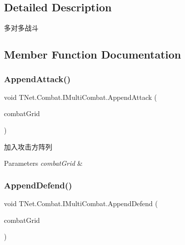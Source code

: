 \subsection{Detailed Description}
多对多战斗 



\subsection{Member Function Documentation}
\mbox{\label{interface_t_net_1_1_combat_1_1_i_multi_combat_a6830542d0db6ef7e89ff9717e3db5781}} 
\subsubsection{\texorpdfstring{Append\+Attack()}{AppendAttack()}}
{\footnotesize\ttfamily void T\+Net.\+Combat.\+I\+Multi\+Combat.\+Append\+Attack (\begin{DoxyParamCaption}\item[{\mbox{\hyperlink{class_t_net_1_1_model_1_1_embattle_queue}{Embattle\+Queue}}}]{combat\+Grid }\end{DoxyParamCaption})}



加入攻击方阵列 


\begin{DoxyParams}{Parameters}
{\em combat\+Grid} & \\
\hline
\end{DoxyParams}
\mbox{\label{interface_t_net_1_1_combat_1_1_i_multi_combat_a8d68c61f5dcba443db9ea60fe411e185}} 
\subsubsection{\texorpdfstring{Append\+Defend()}{AppendDefend()}}
{\footnotesize\ttfamily void T\+Net.\+Combat.\+I\+Multi\+Combat.\+Append\+Defend (\begin{DoxyParamCaption}\item[{\mbox{\hyperlink{class_t_net_1_1_model_1_1_embattle_queue}{Embattle\+Queue}}}]{combat\+Grid }\end{DoxyParamCaption})}




